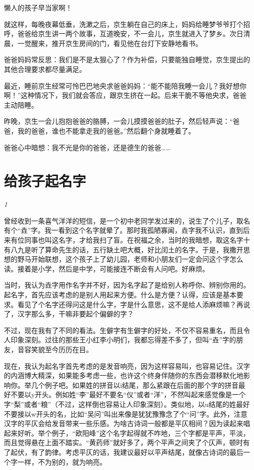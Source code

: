 \documentclass[twoside,openright,headings=optiontohead]{ctexbook} %
\begin{document}
{懒人的孩子早当家啊！

就这样，每晚夜幕低垂，洗漱之后，京生躺在自己的床上，妈妈给睡梦爷爷打个招呼，爸爸给京生讲一两个故事，互道晚安，不一会儿，京生就进入了梦乡。次日清晨，一觉醒来，推开京生房间的门，看见他在台灯下安静地看书。

爸爸妈妈常反思：我们是不是太狠心了？作为补偿，只要能独自睡觉，京生提出的其他合理要求都尽量满足。

最近，睡前京生经常可怜巴巴地央求爸爸妈妈：``能不能陪我睡一会儿？我好想你啊！''这种情况下，我们就会答应，跟京生挤在一起。后来干脆不等他央求，爸爸主动陪睡。

昨晚，京生一会儿抱抱爸爸的胳膊，一会儿摸摸爸爸的肚子，然后轻声说：``爸爸，我的爸爸，谁也不能拿走我的爸爸。''然后翻个身就睡着了。

爸爸心中暗想：我不光是你的爸爸，还是德生的爸爸\ldots{}\ldots{}

\chapter*{给孩子起名字}\label{kids-name}

\emph{1}

曾经收到一条喜气洋洋的短信，是一个初中老同学发过来的，说生了个儿子，取名有个``垚''字。我一看到这个名字就晕了。那时我孤陋寡闻，垚字我不认识，直到后来有位同事也叫这名字，才给我扫了盲。在祝福之余，当时的我暗想，取这名字十有八九是听了算命先生的话，五行缺土吧大概，好比闰土的名字。于是，我撒开思想的野马开始联想，这个孩子上了幼儿园，老师和小朋友们一定会问这个字怎么读。接着是小学，然后是中学，可能接连不断会有人问吧。好麻烦。

当时，我认为垚字用作名字并不好，因为名字起了是给别人称呼你、辨别你用的。起名字，首先应该考虑的是别人用起来方便。什么是方便？认得，应该是基本要求。看见了个名字还得问这是什么字，字是什么意思，这不是给人添麻烦嘛？再说了，汉字那么多，干嘛非要起个偏僻的字？

不过，现在我有了不同的看法。生僻字有生僻字的好处，不仅不容易重名，而且令人印象深刻。过往的那些王小红李小明们，我都忘得差不多了，但叫``垚''字的朋友，音容笑貌至今历历在目。

现在，我认为起名字首先考虑的是发音响亮，因为这样容易叫，也容易记住。汉字的内涵博大精深，如果能多考虑一些，也许这个终身伴随你的东西会潜移默化地影响你。举几个例子吧。如果姓的拼音以i结尾，那么紧跟在后面的那个字的拼音最好不要以y开头。例如姓``李''最好不要名``仪''或者``洋''，不然叫起来感觉像是一个字``梨''或者``粮''（不过，这样倒也容易让人印象深刻）。类似地，以u结尾的姓最好不要接以w开头的名，比如``吴问''叫出来像是犹犹豫豫念了个``问''字。此外，注意汉字的平仄会给发音带来一些乐感。为啥古诗词一般都是平仄相间？因为读起来唱起来好听。举个例子，``欧阳峰''这个名字起得就不咋地，三个字都是平声，平淡，而且觉得悬在上面不踏实。``黄药师''就好多了，两个平声之间夹了个仄声，顿时有了起伏，有了韵律。考虑平仄的话，我建议最好以平声结尾，就像古诗词的最后一个字一样，不为别的，就为响亮。

}
\end{document}
